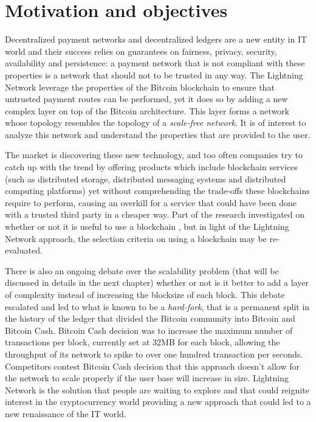 	\section{Motivation and objectives}
	
		Decentralized payment networks and decentralized ledgers are a new entity in IT world and their success relies on guarantees on fairness, privacy, security, availability and persistence: a payment network that is not compliant with these properties is a network that should not to be trusted in any way. The Lightning Network leverage the properties of the Bitcoin blockchain to ensure that untrusted payment routes can be performed, yet it does so by adding a new complex layer on top of the Bitcoin architecture. This layer forms a network whose topology resembles the topology of a \textit{scale-free network}. It is of interest to analyze this network and understand the properties that are provided to the user. 
		
		The market is discovering these new technology, and too often companies try to catch up with the trend by offering products which include blockchain services (such as distributed storage, distributed messaging systems and distributed computing platforms) yet without comprehending the trade-offs these blockchains require to perform, causing an overkill for a service that could have been done with a trusted third party in a cheaper way. Part of the research investigated on whether or not it is useful to use a blockchain \cite{Wust2017}, but in light of the Lightning Network approach, the selection criteria on using a blockchain may be re-evaluated.
		
		There is also an ongoing debate over the scalability problem (that will be discussed in details in the next chapter) whether or not is it better to add a layer of complexity instead of increasing the blocksize of each block. This debate escalated and led to what is known to be a \textit{hard-fork}, that is a  permanent split in the history of the ledger that divided the Bitcoin community into Bitcoin and Bitcoin Cash. Bitcoin Cash decision was to increase the maximum number of transactions per block, currently set at 32MB for each block, allowing the throughput of its network to spike to over one hundred transaction per seconds. Competitors contest Bitcoin Cash decision that this approach doesn't allow for the network to scale properly if the user base will increase in size. Lightning Network is the solution that people are waiting to explore and that could reignite interest in the cryptocurrency world providing a new approach that could led to a new renaissance of the IT world.
		
